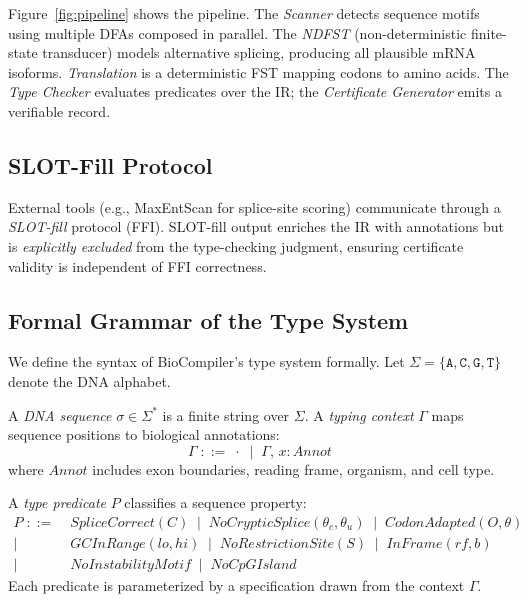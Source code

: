 \documentclass[runningheads]{llncs}
\newcommand{\seq}{\sigma}
\newcommand{\pred}{P}
\begin{document}
Figure~\ref{fig:pipeline} shows the pipeline.
The \emph{Scanner} detects sequence motifs using multiple DFAs composed in parallel.
The \emph{NDFST} (non-deterministic finite-state transducer) models alternative splicing, producing all plausible mRNA isoforms.
\emph{Translation} is a deterministic FST mapping codons to amino acids.
The \emph{Type Checker} evaluates predicates over the IR; the \emph{Certificate Generator} emits a verifiable record.

\subsection{SLOT-Fill Protocol}

External tools (e.g., MaxEntScan for splice-site scoring) communicate through a \emph{SLOT-fill} protocol (FFI).
SLOT-fill output enriches the IR with annotations but is \emph{explicitly excluded} from the type-checking judgment, ensuring certificate validity is independent of FFI correctness.

\subsection{Formal Grammar of the Type System}\label{sec:grammar}

We define the syntax of BioCompiler's type system formally. Let $\Sigma = \{\texttt{A}, \texttt{C}, \texttt{G}, \texttt{T}\}$ denote the DNA alphabet.

\begin{definition}
A \emph{DNA sequence} $\seq \in \Sigma^*$ is a finite string over $\Sigma$.
A \emph{typing context} $\Gamma$ maps sequence positions to biological annotations:
\[
  \Gamma \;::=\; \cdot \;\mid\; \Gamma, \, x : \mathit{Annot}
\]
where $\mathit{Annot}$ includes exon boundaries, reading frame, organism, and cell type.
\end{definition}

\begin{definition}
A \emph{type predicate} $\pred$ classifies a sequence property:
\begin{align*}
  \pred \;::=\; & \mathit{SpliceCorrect}(C) \;\mid\; \mathit{NoCrypticSplice}(\theta_c, \theta_u) \;\mid\; \mathit{CodonAdapted}(O, \theta) \\
  \mid\; & \mathit{GCInRange}(lo, hi) \;\mid\; \mathit{NoRestrictionSite}(S) \;\mid\; \mathit{InFrame}(rf, b) \\
  \mid\; & \mathit{NoInstabilityMotif} \;\mid\; \mathit{NoCpGIsland}
\end{align*}
Each predicate is parameterized by a specification drawn from the context $\Gamma$.
\end{definition}
\end{document}
